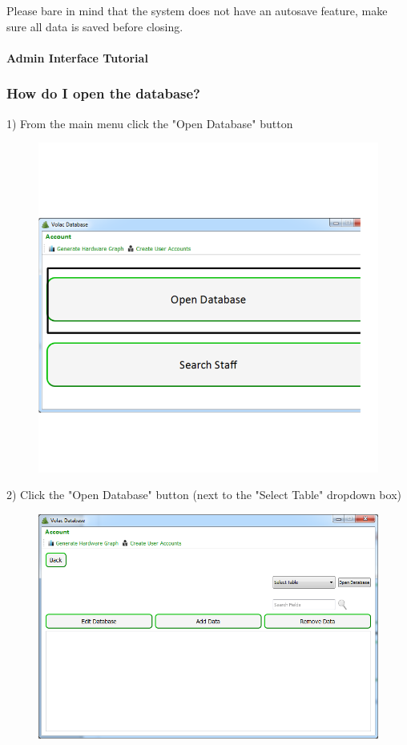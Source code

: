 Please bare in mind that the system does not have an autosave feature, make sure all data is saved before closing.

\paragraph{Admin Interface Tutorial}

\subsubsection{How do I open the database?}\label{opendb}

1) From the main menu click the "Open Database" button

\begin{figure}[H]
    \includegraphics[width=\textwidth]{./Manual/Images/opendb1.png}
\end{figure}


2) Click the "Open Database"  button (next to the "Select Table" dropdown box)

\begin{figure}[H]
    \includegraphics[width=\textwidth]{./Manual/Images/opendb2.png}
\end{figure}



